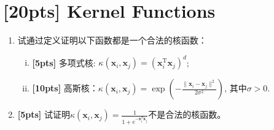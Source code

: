 \documentclass[a4paper,UTF8]{article}
\numberwithin{equation}{section}
\theoremstyle{definition}
\begin{document}
\section{[20pts] Kernel Functions}
\begin{enumerate}[(1)]
\item 试通过定义证明以下函数都是一个合法的核函数：
	\begin{enumerate}[(i)]
	\item \textbf{[5pts]} 多项式核: $\kappa(\mathbf{x}_i,\mathbf{x}_j) = (\mathbf{x}_i^\mathrm{T}\mathbf{x}_j)^d$;
	\item \textbf{[10pts]} 高斯核：$\kappa(\mathbf{x}_i,\mathbf{x}_j) = \exp(-\frac{\lVert \mathbf{x}_i - \mathbf{x}_j \rVert^2}{2\sigma^2})$, 其中$\sigma > 0$.
	\end{enumerate}
\item \textbf{[5pts]} 试证明$\kappa(\mathbf{x}_i,\mathbf{x}_j)=\frac{1}{1+e^{-\mathbf{x}_i^T\mathbf{x}_j}}$不是合法的核函数。
\end{enumerate}
\end{document}
